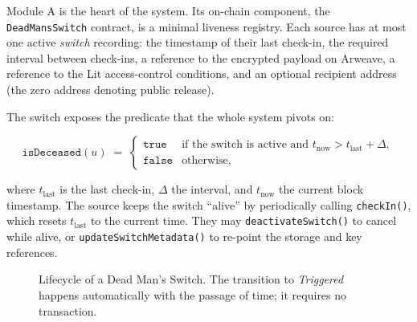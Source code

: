 Module A is the heart of the system. Its on-chain component, the
\texttt{DeadMansSwitch} contract, is a minimal liveness registry. Each source has
at most one active \emph{switch} recording: the timestamp of their last check-in,
the required interval between check-ins, a reference to the encrypted payload on
Arweave, a reference to the Lit access-control conditions, and an optional
recipient address (the zero address denoting public release).

The switch exposes the predicate that the whole system pivots on:

\[
\texttt{isDeceased}(u) \;=\;
\begin{cases}
\texttt{true}  & \text{if the switch is active and } t_{\text{now}} > t_{\text{last}} + \Delta,\\[2pt]
\texttt{false} & \text{otherwise,}
\end{cases}
\]

where $t_{\text{last}}$ is the last check-in, $\Delta$ the interval, and
$t_{\text{now}}$ the current block timestamp. The source keeps the switch
``alive'' by periodically calling \texttt{checkIn()}, which resets $t_{\text{last}}$
to the current time. They may \texttt{deactivateSwitch()} to cancel while alive,
or \texttt{updateSwitchMetadata()} to re-point the storage and key references.

\begin{figure}[htbp]
\centering
{}
\caption{Lifecycle of a Dead Man's Switch. The transition to \emph{Triggered}
happens automatically with the passage of time; it requires no transaction.}
\label{fig:vault-lifecycle}
\end{figure}

